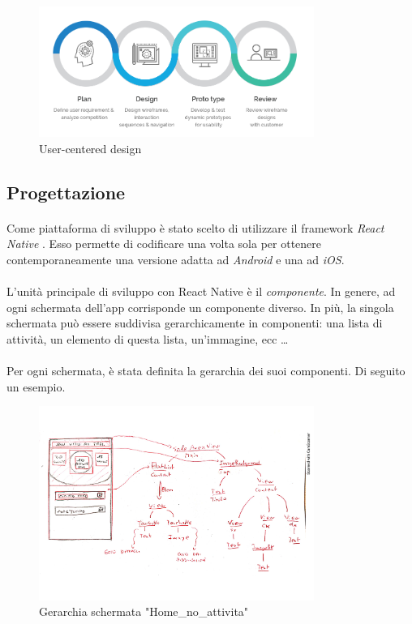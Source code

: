 \documentclass[11pt,a4paper,english]{article}
\begin{document}
\begin{figure}[H]
    \centering
    \includegraphics[width=0.8\textwidth]{img/user-centered-design.png}
    \caption{User-centered design}
\end{figure}

\subsection{Progettazione}

\paragraph{} Come piattaforma di sviluppo è stato scelto di utilizzare il framework \emph{React Native} \cite{react_n}. Esso permette di codificare una volta sola per ottenere contemporaneamente una versione adatta ad \emph{Android} e una ad \emph{iOS}. 

\paragraph{} L'unità principale di sviluppo con React Native è il \emph{componente}. In genere, ad ogni schermata dell'app corrisponde un componente diverso. In più, la singola schermata può essere suddivisa gerarchicamente in componenti: una lista di attività, un elemento di questa lista, un'immagine, ecc \dots

\paragraph{} Per ogni schermata, è stata definita la gerarchia dei suoi componenti. Di seguito un esempio. 

\begin{figure}[H]
    \centering
    \includegraphics[width=0.8\textwidth]{img/componenti home.pdf}
    \caption{Gerarchia schermata "Home\_no\_attivita"}
\end{figure}
\end{document}
